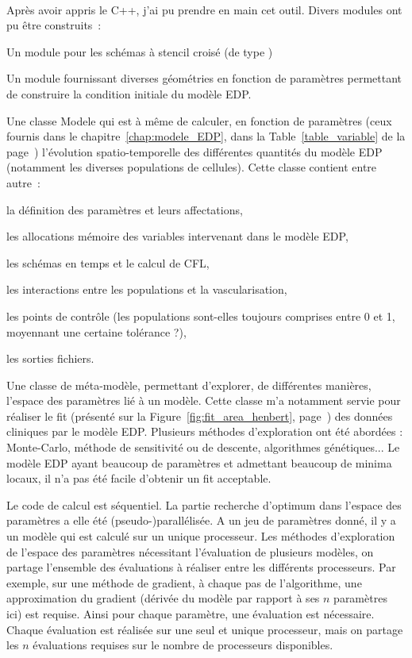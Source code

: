 \documentclass[main.tex]{subfiles}
\begin{document}
\paragraph{}
Après avoir appris le C++, j'ai pu prendre en main cet outil. Divers modules ont pu être construits~:
\begin{myitemize}
\item Un module pour les schémas à stencil croisé (de type \twinweno)
\item Un module fournissant diverses géométries en fonction de paramètres permettant de construire la condition initiale du modèle EDP.
\item Une classe Modele qui est à même de calculer, en fonction de paramètres (ceux fournis dans le chapitre~\ref{chap:modele_EDP}, dans la Table~\ref{table_variable} de la  page~\pageref{table_variable}) l'évolution spatio-temporelle des différentes quantités du modèle EDP (notamment les diverses populations de cellules). 
Cette classe contient entre autre~:
\begin{myitemize}[label=--]
\item la définition des paramètres et leurs affectations,
\item les allocations mémoire des variables intervenant dans le modèle EDP,
\item les schémas en temps et le calcul de CFL, 
\item les interactions entre les populations et la vascularisation, 
\item les points de contrôle (les populations sont-elles toujours comprises entre 0 et 1, moyennant une certaine tolérance ?),
\item les sorties fichiers.
\end{myitemize}
\item Une classe de méta-modèle, permettant d'explorer, de différentes manières, l'espace des paramètres lié à un modèle. Cette classe m'a notamment servie pour réaliser le fit (présenté sur la Figure~\ref{fig:fit_area_henbert}, page~\pageref{fig:fit_area_henbert})  des données cliniques par le modèle EDP. Plusieurs méthodes d'exploration ont été abordées : Monte-Carlo, méthode de sensitivité ou de descente, algorithmes génétiques... Le modèle EDP ayant beaucoup de paramètres et admettant beaucoup de minima locaux, il n'a pas été facile d'obtenir un fit acceptable.
\end{myitemize}


Le code de calcul est séquentiel. La partie recherche d'optimum dans l'espace des paramètres a elle été (pseudo-)parallélisée. A un jeu de paramètres donné, il y a un modèle qui est calculé sur un unique processeur. Les méthodes d'exploration de l'espace des paramètres nécessitant l'évaluation de plusieurs modèles, on partage l'ensemble des évaluations à réaliser entre les différents processeurs. Par exemple, sur une méthode de gradient, à chaque pas de l'algorithme, une approximation du gradient (dérivée du modèle par rapport à ses $n$ paramètres ici) est requise. Ainsi pour chaque paramètre, une évaluation est nécessaire. Chaque évaluation est réalisée sur une seul et unique processeur, mais on partage les $n$ évaluations requises sur le nombre de processeurs disponibles.
\end{document}
